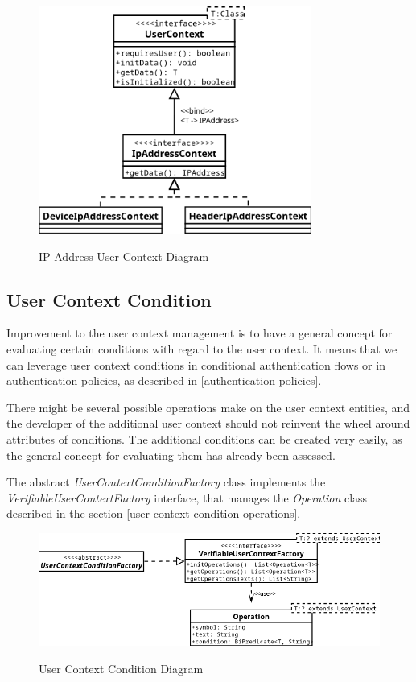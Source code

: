 \begin{figure}[htbp]
  \centering
  \includegraphics[width=0.8\textwidth]{img/sections/5-design/ipAddressContext.png}
  \label{fig:user-context-ip-address-context}
  \caption{IP Address User Context Diagram}
\end{figure}

\subsection{User Context Condition}
Improvement to the user context management is to have a general concept for evaluating certain conditions with regard to the user context.
It means that we can leverage user context conditions in conditional authentication flows or in authentication policies, as described in \ref{authentication-policies}.

There might be several possible operations make on the user context entities, and the developer of the additional user context should not reinvent the wheel around attributes of conditions.
The additional conditions can be created very easily, as the general concept for evaluating them has already been assessed.

The abstract \textit{UserContextConditionFactory} class implements the \textit{VerifiableUserContextFactory} interface, that manages the \textit{Operation} class described in the section \ref{user-context-condition-operations}.

\begin{figure}[htbp]
  \centering
  \includegraphics[width=1\textwidth]{img/sections/5-design/UserContextCondition.png}
  \label{fig:user-context-condition}
  \caption{User Context Condition Diagram}
\end{figure}

